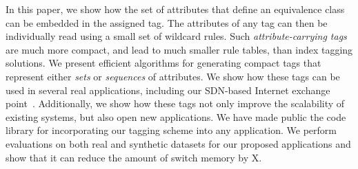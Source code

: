 


In this paper, we show how the set of attributes that define an equivalence class can be embedded in the assigned tag. The attributes of any tag can then be individually read using a small set of wildcard rules.  Such \emph{attribute-carrying tags} are much more compact, and lead to much smaller rule tables, than index tagging solutions.  We present efficient algorithms for generating compact tags that represent either \emph{sets} or \emph{sequences} of attributes.  We show how these tags can be used in several real applications, including our SDN-based Internet exchange point~\cite{isdx}.  Additionally, we show how these tags not only improve the scalability of existing systems, but also open new applications. We have made public the code library for incorporating our tagging scheme into any application. We perform evaluations on both real and synthetic datasets for our proposed applications and show that it can reduce the amount of switch memory by X. 


